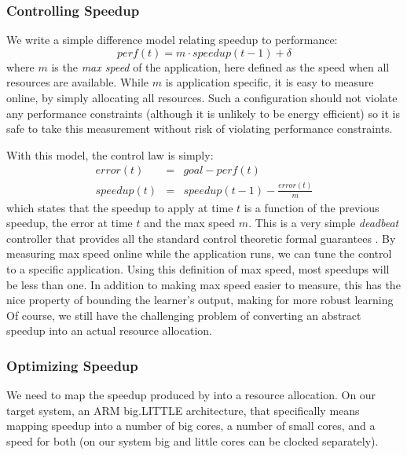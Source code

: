 \subsubsection{Controlling Speedup}
We write a simple difference model relating speedup to performance:
\begin{equation}
  perf(t) = m \cdot speedup(t-1) + \delta \label{eqn:speedup}
\end{equation}
where $m$ is the \emph{max speed} of the application, here defined as
the speed when all resources are available.  While $m$ is application
specific, it is easy to measure online, by simply allocating all
resources. Such a configuration should not violate any performance
constraints (although it is unlikely to be energy efficient) so it is
safe to take this measurement without risk of violating performance
constraints.

With this model, the control law is simply:
\begin{eqnarray}
  error(t) &=& goal - perf(t) \label{eqn:speedup-error} \\
  speedup(t) &=& speedup(t-1) - \frac{error(t)}{m}
  \label{eqn:speedup-control}
\end{eqnarray}
which states that the speedup to apply at time $t$ is a function of
the previous speedup, the error at time $t$ and the max speed $m$.
This is a very simple \emph{deadbeat} controller that provides all the
standard control theoretic formal guarantees
\cite{seec-cdc2010,ICSE2014}.  By measuring max speed online while the
application runs, we can tune the control to a specific application.
Using this definition of max speed, most speedups will be less than
one.  In addition to making max speed easier to measure, this has the
nice property of bounding the learner's output, making for more robust
learning  Of course, we still have the challenging problem of
converting an abstract speedup into an actual resource allocation.


\subsubsection{Optimizing Speedup}
We need to map the speedup produced by  into a
resource allocation.  On our target system, an ARM big.LITTLE
architecture, that specifically means mapping speedup into a number of
big cores, a number of small cores, and a speed for both (on our
system big and little cores can be clocked separately).

